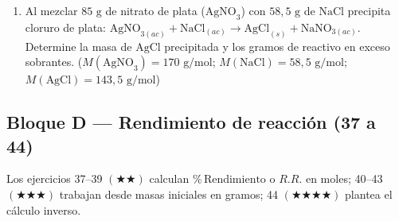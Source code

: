 \documentclass[12pt, letterpaper]{article}
\newcommand{\pc}{\text{\%}}
\begin{document}
\begin{enumerate}[leftmargin=*, start=25]
  \item \dificil{}\hspace{0.55em}Al mezclar $85\text{ g}$ de nitrato de plata ($\text{AgNO}_3$) con $58{,}5\text{ g}$ de $\text{NaCl}$ precipita cloruro de plata: $\text{AgNO}_{3(ac)} + \text{NaCl}_{(ac)} \longrightarrow \text{AgCl}_{(s)} + \text{NaNO}_{3(ac)}$. Determine la masa de $\text{AgCl}$ precipitada y los gramos de reactivo en exceso sobrantes. ($M(\text{AgNO}_3) = 170\text{ g/mol}$; $M(\text{NaCl}) = 58{,}5\text{ g/mol}$; $M(\text{AgCl}) = 143{,}5\text{ g/mol}$)

\end{enumerate}

\subsection{Bloque D — Rendimiento de reacción (37 a 44)}

\noindent Los ejercicios 37--39 $(\bigstar\bigstar)$ calculan $\pc\,\text{Rendimiento}$ o $R.R.$ en moles; 40--43 $(\bigstar\bigstar\bigstar)$ trabajan desde masas iniciales en gramos; 44 $(\bigstar\bigstar\bigstar\bigstar)$ plantea el cálculo inverso.
\end{document}
